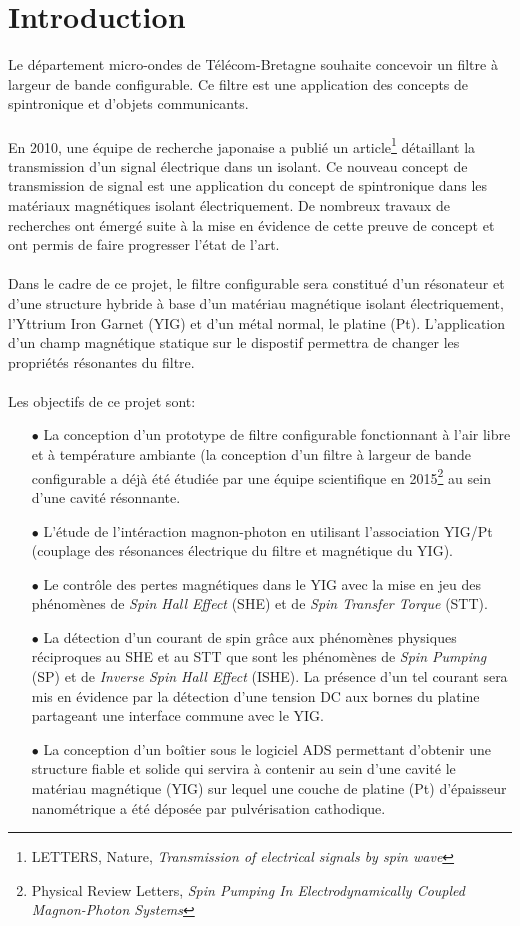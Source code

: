 \documentclass[12pt,fleqn]{book} %
\begin{document}
\part{Introduction}
Le département micro-ondes de Télécom-Bretagne souhaite concevoir un filtre à
largeur de bande configurable. Ce filtre est une application des concepts de spintronique et d’objets communicants.
~\\\\En 2010, une équipe de recherche japonaise a publié un article\footnote{LETTERS, Nature, \emph{Transmission of electrical signals by spin wave}} détaillant la transmission d’un signal électrique dans un isolant. Ce nouveau concept de transmission de
signal est une application du concept de spintronique dans les matériaux magnétiques
isolant électriquement. De nombreux travaux de recherches ont émergé suite à la mise
en évidence de cette preuve de concept et ont permis de faire progresser l’état de l’art.
~\\\\Dans le cadre de ce projet, le filtre configurable sera constitué d’un résonateur et d’une
structure hybride à base d’un matériau magnétique isolant électriquement, l’Yttrium
Iron Garnet (YIG) et d’un métal normal, le platine (Pt). L’application d’un champ
magnétique statique sur le dispostif permettra de changer les propriétés résonantes du
filtre.
~\\\\Les objectifs de ce projet sont:
~\\
\begin{itemize}
 \item[$\bullet$] La conception d'un prototype de filtre configurable fonctionnant à l'air libre et à température ambiante (la conception d'un filtre à largeur de bande configurable a déjà été étudiée par une équipe scientifique en 2015\footnote{Physical Review Letters, \emph{Spin Pumping In Electrodynamically Coupled Magnon-Photon Systems}} au sein d'une cavité résonnante.
 \item[$\bullet$] L'étude de l'intéraction magnon-photon en utilisant l'association YIG/Pt (couplage des résonances électrique du filtre et magnétique du YIG).
 \item[$\bullet$] Le contrôle des pertes magnétiques dans le YIG avec la mise en jeu des phénomènes de \emph{Spin Hall Effect} (SHE) et de \emph{Spin Transfer Torque} (STT).
 \item[$\bullet$] La détection d’un courant de spin grâce aux phénomènes physiques réciproques au SHE et au STT que sont les phénomènes de \emph{Spin Pumping} (SP) et de \emph{Inverse Spin Hall Effect} (ISHE). La présence d'un tel courant sera mis en évidence par la détection d'une tension DC aux bornes du platine partageant une interface commune avec le YIG.
 \item[$\bullet$] La conception d’un boîtier sous le logiciel ADS permettant d’obtenir une structure fiable et solide qui servira à contenir au sein d’une cavité le matériau magnétique (YIG) sur lequel
une couche de platine (Pt) d’épaisseur nanométrique a été déposée par pulvérisation
cathodique.
\end{itemize}
\setcounter{chapter}{1}
\end{document}
